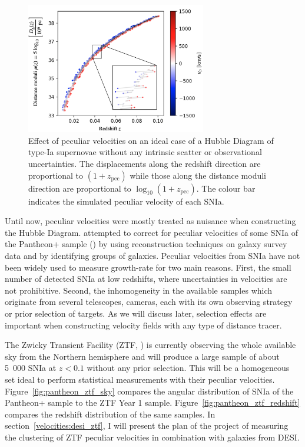    \begin{figure}
        \centering 
        \includegraphics[width=0.7\textwidth]{fig/velocities/pv_hubble_diagram_snia.png}
        \caption{Effect of peculiar velocities on an ideal case of a Hubble Diagram of 
        type-Ia supernovae without any intrinsic scatter or observational uncertainties.
        The displacements along the redshift direction are proportional to $(1+z_\text{pec})$
        while those along the distance moduli direction are proportional to $\log_{10}(1+z_\text{pec})$.
        The colour bar indicates the simulated peculiar velocity of each SNIa. }
        \label{fig:pv_hubble_diagram_snia}
    \end{figure}

    Until now, peculiar velocities were mostly treated as nuisance when 
    constructing the Hubble Diagram. 
    \cite{petersonPantheonAnalysisEvaluating2021} 
    attempted to correct for peculiar velocities of some SNIa of the Pantheon+ sample 
    (\cite{scolnicPantheonAnalysisFull2021}) by using reconstruction techniques on 
    galaxy survey data and by identifying groups of galaxies. 
    Peculiar velocities from SNIa have not been widely used to measure growth-rate for two main 
    reasons. First, the small number of detected SNIa at low redshifts, where uncertainties in 
    velocities are not prohibitive. Second, the inhomogeneity in the available samples which 
    originate from several telescopes, cameras, each with its own observing strategy or 
    prior selection of targets. As we will discuss later, selection effects are important 
    when constructing velocity fields with any type of distance tracer. 
    
    The Zwicky Transient Facility (ZTF, \cite{grahamZwickyTransientFacility2019}) 
    is currently observing the whole available sky from the Northern 
    hemisphere and will produce a large sample of about 5~000 SNIa at $z<0.1$ without any prior 
    selection. This will be a homogeneous set ideal to perform statistical measurements with their 
    peculiar velocities.
    Figure~\ref{fig:pantheon_ztf_sky} compares the angular distribution of SNIa of the Pantheon+ sample 
    to the ZTF Year 1 sample.  
    Figure~\ref{fig:pantheon_ztf_redshift} compares the redshift distribution of the same samples. 
    In section~\ref{velocities:desi_ztf}, I will present the plan of the project of measuring 
    the clustering of ZTF peculiar velocities in combination with galaxies from DESI. 
    
